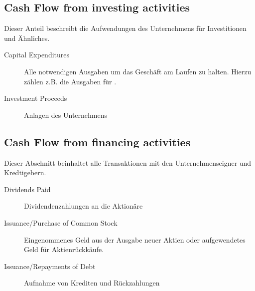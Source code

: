 %
\subsection{Cash Flow from investing activities}

Dieser Anteil beschreibt die Aufwendungen des Unternehmens für Investitionen und Ähnliches.
\begin{description}
    \item[Capital Expenditures] Alle notwendigen Ausgaben um das Geschäft am Laufen zu halten. 
        Hierzu zählen z.B. die Ausgaben für .
    \item[Investment Proceeds] Anlagen des Unternehmens  
\end{description}

%
\subsection{Cash Flow from financing activities}

Dieser Abschnitt beinhaltet alle Transaktionen mit den Unternehmenseigner und Kredtigebern.
\begin{description}
    \item[Dividends Paid] Dividendenzahlungen an die Aktionäre
    \item[Issuance/Purchase of Common Stock] Eingenommenes Geld aus der Ausgabe neuer Aktien oder aufgewendetes Geld für Aktienrückkäufe.
    \item[Issuance/Repayments of Debt] Aufnahme von Krediten und Rückzahlungen  
\end{description}

